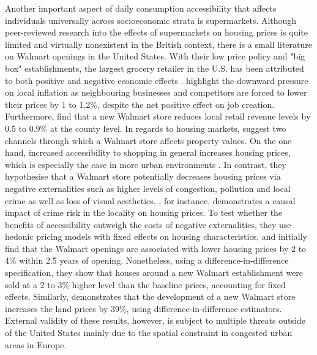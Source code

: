 \documentclass{article}
\begin{document}
Another important aspect of daily consumption accessibility that affects individuals universally across socioeconomic strata is supermarkets. Although peer-reviewed research into the effects of supermarkets on housing prices is quite limited and virtually nonexistent in the British context, there is a small literature on Walmart openings in the United States. With their low price policy and "big box" establishments, the largest grocery retailer in the U.S. has been attributed to both positive and negative economic effects \citep{TheEconomist2006OpeningEffect}. \citet{Basker2009TheIndustry} highlight the downward pressure on local inflation as neighbouring businesses and competitors are forced to lower their prices by 1 to 1.2\%, despite the net positive effect on job creation. Furthermore, \citet{Dube2007FirmSector} find that a new Walmart store reduces local retail revenue levels by 0.5 to 0.9\% at the county level. In regards to housing markets, \citet{Pope2015WhenAlways} suggest two channels through which a Walmart store affects property values. On the one hand, increased accessibility to shopping in general increases housing prices, which is especially the case in more urban environments \citep{Emrath2002ExplainingPrices}. In contrast, they hypothesise that a Walmart store potentially decreases housing prices via negative externalities such as higher levels of congestion, pollution and local crime as well as loss of visual aesthetics. \citet{Linden2008EstimatesLaws}, for instance, demonstrates a causal impact of crime risk in the locality on housing prices. To test whether the benefits of accessibility outweigh the costs of negative externalities, they use hedonic pricing models with fixed effects on housing characteristics, and initially find that the Walmart openings are associated with lower housing prices by 2 to 4\% within 2.5 years of opening. Nonetheless, using a difference-in-difference specification, they show that houses around a new Walmart establishment were sold at a 2 to 3\% higher level than the baseline prices, accounting for fixed effects. Similarly, \citet{Slade2016Walmart} demonstrates that the development of a new Walmart store increases the land prices by 39\%, using difference-in-difference estimators. External validity of these results, however, is subject to multiple threats outside of the United States mainly due to the spatial constraint in congested urban areas in Europe.
\end{document}
